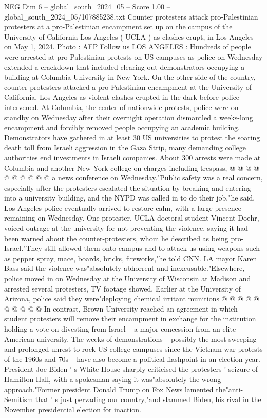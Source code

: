 \begin{textsample}{NEG Dim 6 – global\_south\_2024\_05 – Score 1.00 – global\_south\_2024\_05/107885238.txt}  \label{ex:f6_neg_246}
Counter protesters attack pro-Palestinian protesters at a pro-Palestinian encampment set up on the campus of the University of California Los Angeles ( UCLA ) as clashes erupt, in Los Angeles on May 1, 2024.
Photo : AFP Follow us LOS ANGELES : Hundreds of people were arrested at pro-Palestinian protests on US campuses as police on Wednesday extended a crackdown that included clearing out demonstrators occupying a building at Columbia University in New York.
On the other side of the country, counter-protesters attacked a pro-Palestinian encampment at the University of California, Los Angeles as violent clashes erupted in the dark before police intervened.
At Columbia, the center of nationwide protests, police were on standby on Wednesday after their overnight operation dismantled a weeks-long encampment and forcibly removed people occupying an academic building.
Demonstrators have gathered in at least 30 US universities to protest the soaring death toll from Israeli aggression in the Gaza Strip, many demanding college authorities end investments in Israeli companies.
About 300 arrests were made at Columbia and another New York college on charges including trespass, @ @ @ @ @ @ @ @ @ @ a news conference on Wednesday."Public safety was a real concern, especially after the protesters escalated the situation by breaking and entering into a university building, and the NYPD was called in to do their job,"he said.
Los Angeles police eventually arrived to restore calm, with a large presence remaining on Wednesday.
One protester, UCLA doctoral student Vincent Doehr, voiced outrage at the university for not preventing the violence, saying it had been warned about the counter-protesters, whom he described as being pro-Israel."They still allowed them onto campus and to attack us using weapons such as pepper spray, mace, boards, bricks, fireworks,"he told CNN.
LA mayor Karen Bass said the violence was"absolutely abhorrent and inexcusable."Elsewhere, police moved in on Wednesday at the University of Wisconsin at Madison and arrested several protesters, TV footage showed.
Earlier at the University of Arizona, police said they were"deploying chemical irritant munitions @ @ @ @ @ @ @ @ @ @ In contrast, Brown University reached an agreement in which student protesters will remove their encampment in exchange for the institution holding a vote on divesting from Israel -- a major concession from an elite American university.
The weeks of demonstrations -- possibly the most sweeping and prolonged unrest to rock US college campuses since the Vietnam war protests of the 1960s and 70s -- have also become a political flashpoint in an election year.
President Joe Biden ' s White House sharply criticised the protesters ' seizure of Hamilton Hall, with a spokesman saying it was"absolutely the wrong approach."Former president Donald Trump on Fox News lamented the"anti-Semitism that ' s just pervading our country,"and slammed Biden, his rival in the November presidential election for inaction.

\end{textsample}
